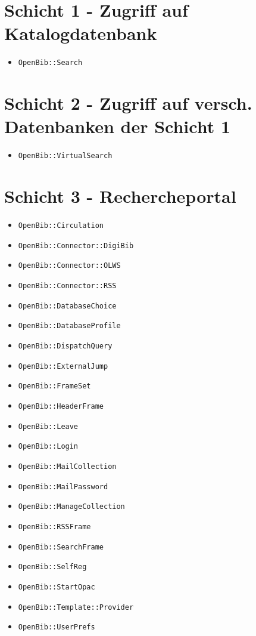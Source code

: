 \documentclass[11pt, twoside, a4paper, BCOR8mm, DIV12, bibtotoc,idxtotoc]{scrbook}
\begin{document}
\section{Schicht 1 - Zugriff auf Katalogdatenbank}

\begin{itemize}
\item \texttt{OpenBib::Search}
\end{itemize}

\section{Schicht 2 - Zugriff auf versch. Datenbanken der Schicht 1}

\begin{itemize}
\item \texttt{OpenBib::VirtualSearch}
\end{itemize}

\section{Schicht 3 - Rechercheportal}

\begin{itemize}
\item \texttt{OpenBib::Circulation}
\item \texttt{OpenBib::Connector::DigiBib}
\item \texttt{OpenBib::Connector::OLWS}
\item \texttt{OpenBib::Connector::RSS}
\item \texttt{OpenBib::DatabaseChoice}
\item \texttt{OpenBib::DatabaseProfile}
\item \texttt{OpenBib::DispatchQuery}
\item \texttt{OpenBib::ExternalJump}
\item \texttt{OpenBib::FrameSet}
\item \texttt{OpenBib::HeaderFrame}
\item \texttt{OpenBib::Leave}
\item \texttt{OpenBib::Login}
\item \texttt{OpenBib::MailCollection}
\item \texttt{OpenBib::MailPassword}
\item \texttt{OpenBib::ManageCollection}
\item \texttt{OpenBib::RSSFrame}
\item \texttt{OpenBib::SearchFrame}
\item \texttt{OpenBib::SelfReg}
\item \texttt{OpenBib::StartOpac}
\item \texttt{OpenBib::Template::Provider}
\item \texttt{OpenBib::UserPrefs}
\end{itemize}
\end{document}
